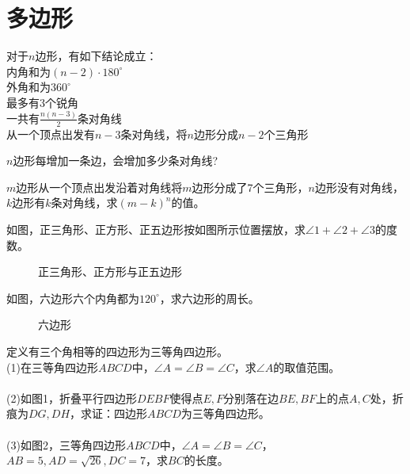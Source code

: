 \section{多边形}
\begin{theorem}
    对于$n$边形，有如下结论成立： \\
    内角和为$(n-2)·180^{\circ}$ \\
    外角和为$360^{\circ}$ \\
    最多有3个锐角 \\
    一共有$\frac{n(n-3)}{2}$条对角线 \\
    从一个顶点出发有$n-3$条对角线，将$n$边形分成$n-2$个三角形 \\
\end{theorem}
\begin{problem}
$n$边形每增加一条边，会增加多少条对角线? \\
\end{problem}
\begin{problem}
$m$边形从一个顶点出发沿着对角线将$m$边形分成了7个三角形，$n$边形没有对角线，$k$边形有$k$条对角线，求$(m-k)^n$的值。\\
\end{problem}
\begin{problem}
如图，正三角形、正方形、正五边形按如图所示位置摆放，求$\angle 1 +\angle 2 + \angle 3$的度数。
\end{problem}
\begin{figure}[H]
    \centering
    \resizebox{3cm}{!}{}
    \caption{正三角形、正方形与正五边形}
\end{figure}
\begin{problem}
如图，六边形六个内角都为$120^\circ$，求六边形的周长。
\end{problem}
\begin{figure}[H]
    \centering
    \resizebox{3cm}{!}{}
    \caption{六边形}
\end{figure}
\begin{problem}
定义有三个角相等的四边形为三等角四边形。\\
(1)在三等角四边形$ABCD$中，$\angle A=\angle B=\angle C$，求$\angle A$的取值范围。 \\
\\
(2)如图1，折叠平行四边形$DEBF$使得点$E,F$分别落在边$BE,BF$上的点$A,C$处，折痕为$DG,DH$，求证：四边形$ABCD$为三等角四边形。\\
\\
(3)如图2，三等角四边形$ABCD$中，$\angle A=\angle B=\angle C$，$AB=5,AD=\sqrt{26},DC=7$，求$BC$的长度。 \\
\\
\end{problem}

